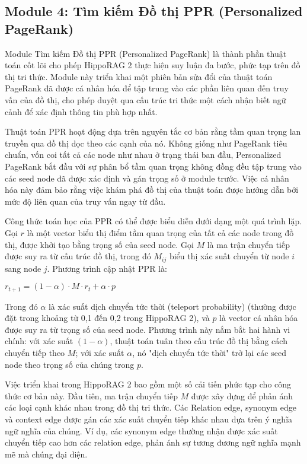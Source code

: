 \documentclass[../main.tex]{subfiles}
\begin{document}
\subsection{Module 4: Tìm kiếm Đồ thị PPR (Personalized PageRank)}
Module Tìm kiếm Đồ thị PPR (Personalized PageRank) là thành phần thuật toán cốt lõi cho phép HippoRAG 2 thực hiện suy luận đa bước, phức tạp trên đồ thị tri thức. Module này triển khai một phiên bản sửa đổi của thuật toán PageRank đã được cá nhân hóa để tập trung vào các phần liên quan đến truy vấn của đồ thị, cho phép duyệt qua cấu trúc tri thức một cách nhận biết ngữ cảnh để xác định thông tin phù hợp nhất.

Thuật toán PPR hoạt động dựa trên nguyên tắc cơ bản rằng tầm quan trọng lan truyền qua đồ thị dọc theo các cạnh của nó. Không giống như PageRank tiêu chuẩn, vốn coi tất cả các node như nhau ở trạng thái ban đầu, Personalized PageRank bắt đầu với sự phân bổ tầm quan trọng không đồng đều tập trung vào các seed node đã được xác định và gán trọng số ở module trước. Việc cá nhân hóa này đảm bảo rằng việc khám phá đồ thị của thuật toán được hướng dẫn bởi mức độ liên quan của truy vấn ngay từ đầu.

Công thức toán học của PPR có thể được biểu diễn dưới dạng một quá trình lặp. Gọi $r$ là một vector biểu thị điểm tầm quan trọng của tất cả các node trong đồ thị, được khởi tạo bằng trọng số của seed node. Gọi $M$ là ma trận chuyển tiếp được suy ra từ cấu trúc đồ thị, trong đó $M_{ij}$ biểu thị xác suất chuyển từ node $i$ sang node $j$. Phương trình cập nhật PPR là:

$r_{t+1} = (1-\alpha) \cdot M \cdot r_t + \alpha \cdot p$

Trong đó $\alpha$ là xác suất dịch chuyển tức thời (teleport probability) (thường được đặt trong khoảng từ 0,1 đến 0,2 trong HippoRAG 2), và $p$ là vector cá nhân hóa được suy ra từ trọng số của seed node. Phương trình này nắm bắt hai hành vi chính: với xác suất $(1-\alpha)$, thuật toán tuân theo cấu trúc đồ thị bằng cách chuyển tiếp theo $M$; với xác suất $\alpha$, nó "dịch chuyển tức thời" trở lại các seed node theo trọng số của chúng trong $p$.

Việc triển khai trong HippoRAG 2 bao gồm một số cải tiến phức tạp cho công thức cơ bản này. Đầu tiên, ma trận chuyển tiếp $M$ được xây dựng để phản ánh các loại cạnh khác nhau trong đồ thị tri thức. Các Relation edge, synonym edge và context edge được gán các xác suất chuyển tiếp khác nhau dựa trên ý nghĩa ngữ nghĩa của chúng. Ví dụ, các synonym edge thường nhận được xác suất chuyển tiếp cao hơn các relation edge, phản ánh sự tương đương ngữ nghĩa mạnh mẽ mà chúng đại diện.
\end{document}

